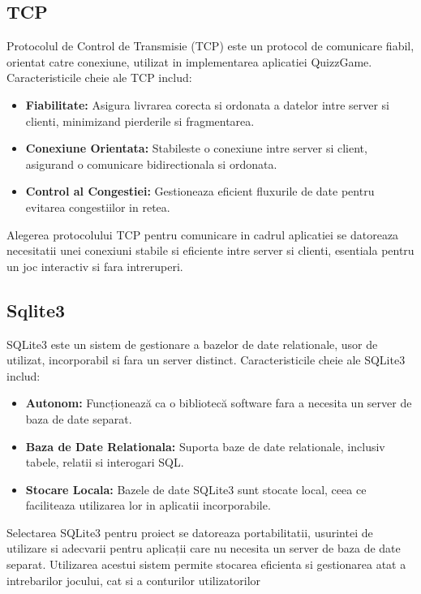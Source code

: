 \documentclass[runningheads]{llncs}
\begin{document}
\subsection{TCP}

Protocolul de Control de Transmisie (TCP) este un protocol de comunicare fiabil, orientat catre conexiune, utilizat in implementarea aplicatiei QuizzGame. Caracteristicile cheie ale TCP includ:

\begin{itemize}[label=$\bullet$]
    \item \textbf{Fiabilitate:} Asigura livrarea corecta si ordonata a datelor intre server si clienti, minimizand pierderile si fragmentarea.
    \item \textbf{Conexiune Orientata:} Stabileste o conexiune intre server si client, asigurand o comunicare bidirectionala si ordonata.
    \item \textbf{Control al Congestiei:} Gestioneaza eficient fluxurile de date pentru evitarea congestiilor in retea.
\end{itemize}

Alegerea protocolului TCP pentru comunicare in cadrul aplicatiei se datoreaza necesitatii unei conexiuni stabile si eficiente intre server si clienti, esentiala pentru un joc interactiv si fara intreruperi.


\subsection{Sqlite3}

SQLite3 este un sistem de gestionare a bazelor de date relationale, usor de utilizat, incorporabil si fara un server distinct. Caracteristicile cheie ale SQLite3 includ:

\begin{itemize}[label=$\bullet$]
    \item \textbf{Autonom:} Funcționează ca o bibliotecă software fara a necesita un server de baza de date separat.
    \item \textbf{Baza de Date Relationala:} Suporta baze de date relationale, inclusiv tabele, relatii si interogari SQL.
    \item \textbf{Stocare Locala:} Bazele de date SQLite3 sunt stocate local, ceea ce faciliteaza utilizarea lor in aplicatii incorporabile.
\end{itemize}

Selectarea SQLite3 pentru proiect se datoreaza portabilitatii, usurintei de utilizare si adecvarii pentru aplicații care nu necesita un server de baza de date separat. Utilizarea acestui sistem permite stocarea eficienta si gestionarea atat a intrebarilor jocului, cat si a conturilor utilizatorilor
\end{document}
